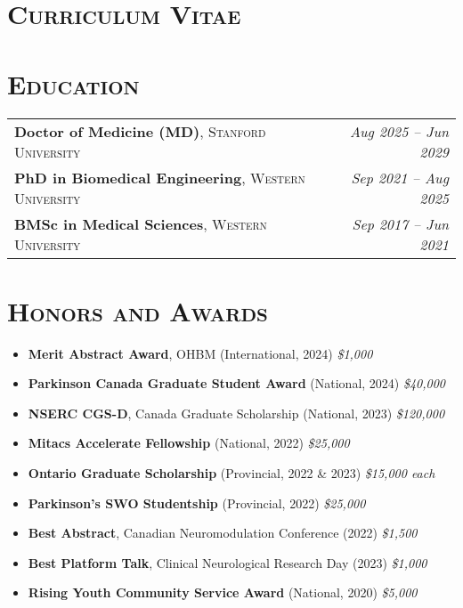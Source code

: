 \section*{\textsc{Curriculum Vitae}}

\vspace{1em}
\section*{\textsc{Education}} \noindent\hrulefill \vspace{0.5em}
\begin{tabularx}{\textwidth}{@{}X r@{}}
\textbf{Doctor of Medicine (MD)}, \textsc{Stanford University} & \textit{Aug 2025 – Jun 2029} \\
\textbf{PhD in Biomedical Engineering}, \textsc{Western University} & \textit{Sep 2021 – Aug 2025} \\
\textbf{BMSc in Medical Sciences}, \textsc{Western University} & \textit{Sep 2017 – Jun 2021} \\
\end{tabularx}

\vspace{1.5em}
\section*{\textsc{Honors and Awards}} \noindent\hrulefill \vspace{0.5em}
\begin{itemize}
  \item \textbf{Merit Abstract Award}, OHBM (International, 2024) \hfill \textit{\$1,000}
  \item \textbf{Parkinson Canada Graduate Student Award} (National, 2024) \hfill \textit{\$40,000}
  \item \textbf{NSERC CGS-D}, Canada Graduate Scholarship (National, 2023) \hfill \textit{\$120,000}
  \item \textbf{Mitacs Accelerate Fellowship} (National, 2022) \hfill \textit{\$25,000}
  \item \textbf{Ontario Graduate Scholarship} (Provincial, 2022 \& 2023) \hfill \textit{\$15,000 each}
  \item \textbf{Parkinson’s SWO Studentship} (Provincial, 2022) \hfill \textit{\$25,000}
  \item \textbf{Best Abstract}, Canadian Neuromodulation Conference (2022) \hfill \textit{\$1,500}
  \item \textbf{Best Platform Talk}, Clinical Neurological Research Day (2023) \hfill \textit{\$1,000}
  \item \textbf{Rising Youth Community Service Award} (National, 2020) \hfill \textit{\$5,000}

\end{itemize}
\vspace{1.5em}
